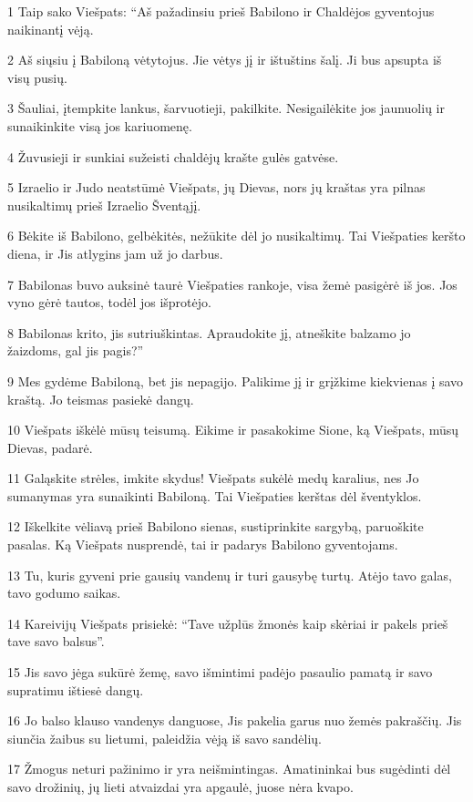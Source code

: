\par 1 Taip sako Viešpats: “Aš pažadinsiu prieš Babilono ir Chaldėjos gyventojus naikinantį vėją. 
\par 2 Aš siųsiu į Babiloną vėtytojus. Jie vėtys jį ir ištuštins šalį. Ji bus apsupta iš visų pusių. 
\par 3 Šauliai, įtempkite lankus, šarvuotieji, pakilkite. Nesigailėkite jos jaunuolių ir sunaikinkite visą jos kariuomenę. 
\par 4 Žuvusieji ir sunkiai sužeisti chaldėjų krašte gulės gatvėse. 
\par 5 Izraelio ir Judo neatstūmė Viešpats, jų Dievas, nors jų kraštas yra pilnas nusikaltimų prieš Izraelio Šventąjį. 
\par 6 Bėkite iš Babilono, gelbėkitės, nežūkite dėl jo nusikaltimų. Tai Viešpaties keršto diena, ir Jis atlygins jam už jo darbus. 
\par 7 Babilonas buvo auksinė taurė Viešpaties rankoje, visa žemė pasigėrė iš jos. Jos vyno gėrė tautos, todėl jos išprotėjo. 
\par 8 Babilonas krito, jis sutriuškintas. Apraudokite jį, atneškite balzamo jo žaizdoms, gal jis pagis?” 
\par 9 Mes gydėme Babiloną, bet jis nepagijo. Palikime jį ir grįžkime kiekvienas į savo kraštą. Jo teismas pasiekė dangų. 
\par 10 Viešpats iškėlė mūsų teisumą. Eikime ir pasakokime Sione, ką Viešpats, mūsų Dievas, padarė. 
\par 11 Galąskite strėles, imkite skydus! Viešpats sukėlė medų karalius, nes Jo sumanymas yra sunaikinti Babiloną. Tai Viešpaties kerštas dėl šventyklos. 
\par 12 Iškelkite vėliavą prieš Babilono sienas, sustiprinkite sargybą, paruoškite pasalas. Ką Viešpats nusprendė, tai ir padarys Babilono gyventojams. 
\par 13 Tu, kuris gyveni prie gausių vandenų ir turi gausybę turtų. Atėjo tavo galas, tavo godumo saikas. 
\par 14 Kareivijų Viešpats prisiekė: “Tave užplūs žmonės kaip skėriai ir pakels prieš tave savo balsus”. 
\par 15 Jis savo jėga sukūrė žemę, savo išmintimi padėjo pasaulio pamatą ir savo supratimu ištiesė dangų. 
\par 16 Jo balso klauso vandenys danguose, Jis pakelia garus nuo žemės pakraščių. Jis siunčia žaibus su lietumi, paleidžia vėją iš savo sandėlių. 
\par 17 Žmogus neturi pažinimo ir yra neišmintingas. Amatininkai bus sugėdinti dėl savo drožinių, jų lieti atvaizdai yra apgaulė, juose nėra kvapo. 
